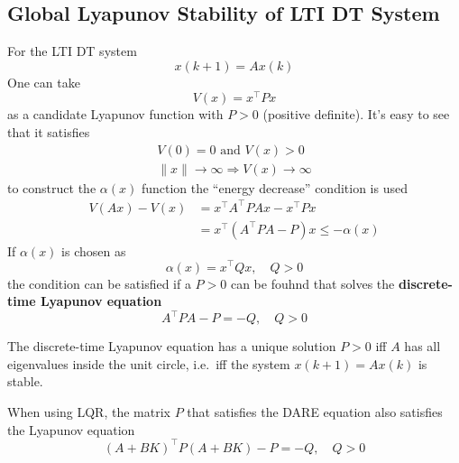 \subsection{Global Lyapunov Stability of LTI DT System}

For the LTI DT system
\begin{equation*}
    x(k+1)=Ax(k)
\end{equation*}
One can take
\begin{equation*}
    V(x) = x^\top Px
\end{equation*}
as a candidate Lyapunov function with $P>0$ (positive definite). It's easy to see that it satisfies
\begin{gather*}
    V(0) = 0 \text{ and } V(x) > 0 \\
    \lVert x \rVert \to \infty \Rightarrow V(x) \to \infty
\end{gather*}
to construct the $\alpha(x)$ function the ``energy decrease'' condition is used
\begin{align*}
    V(Ax) - V(x) & = x^\top A^\top PAx - x^\top Px                      \\
                 & = x^\top \left(A^\top PA - P\right)x \leq -\alpha(x)
\end{align*}
If $\alpha(x)$ is chosen as
\begin{equation*}
    \alpha(x) = x^\top Qx, \quad Q > 0
\end{equation*}
the condition can be satisfied if a $P>0$ can be fouhnd that solves the \textbf{discrete-time Lyapunov equation}
\begin{equation*}
    A^\top PA -P = -Q, \quad Q > 0
\end{equation*}

The discrete-time Lyapunov equation has a unique solution $P > 0$ iff $A$ has all eigenvalues inside the unit circle, i.e.\ iff the system $x(k + 1) = Ax(k)$ is stable.

\newpar{}
When using LQR, the matrix $P$ that satisfies the DARE equation also satisfies the Lyapunov equation
\noindent\begin{equation*}
    {(A+BK)}^\top P{(A+BK)} -P = -Q, \quad Q>0
\end{equation*}

